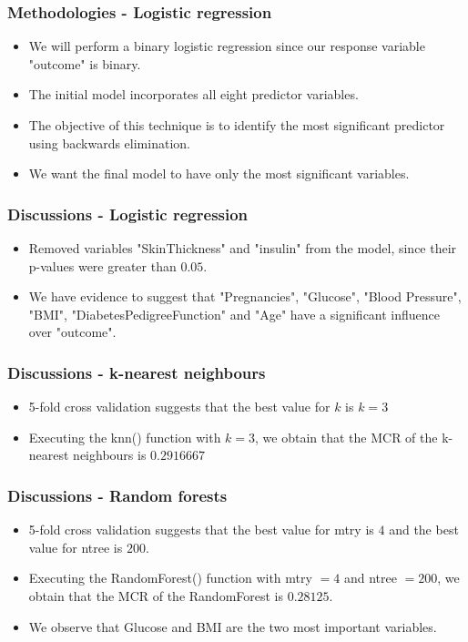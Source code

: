 \documentclass{beamer}
\begin{document}
\begin{frame}
    \frametitle{Methodologies - Logistic regression}
        \begin{itemize}
            \setlength\itemsep{1em}
            \item We will perform a binary logistic regression \cite{faraway2016extending} since our response variable "outcome" is binary.
            \item The initial model incorporates all eight predictor variables.
            \item The objective of this technique is to identify the most significant predictor using backwards elimination.
            \item We want the final model to have only the most significant variables.
        \end{itemize}
\end{frame}

\begin{frame}
    \frametitle{Discussions - Logistic regression}
        \begin{itemize}
            \setlength\itemsep{1em}
            \item Removed variables "SkinThickness" and "insulin" from the model, since their p-values were greater than $0.05$.
            \item We have evidence to suggest that "Pregnancies", "Glucose", "Blood Pressure", "BMI", "DiabetesPedigreeFunction" and "Age" have a significant influence over "outcome".
        \end{itemize}
\end{frame}

\begin{frame}
    \frametitle{Discussions - k-nearest neighbours}
        \begin{itemize}
            \setlength\itemsep{1em}
            \item 5-fold cross validation suggests that the best value for $k$ is $k=3$
            \item Executing the knn() function with $k=3$, we obtain that the MCR of the k-nearest neighbours is $0.2916667$
        \end{itemize}
\end{frame}

\begin{frame}
    \frametitle{Discussions - Random forests}
        \begin{itemize}
            \setlength\itemsep{1em}
            \item 5-fold cross validation suggests that the best value for mtry is $4$ and the best value for ntree is $200$.
            \item Executing the RandomForest() function with mtry $=4$ and ntree $=200$, we obtain that the MCR of the RandomForest is $0.28125$.
            \item We observe that Glucose and BMI are the two most important variables.
        \end{itemize}
\end{frame}
\end{document}
